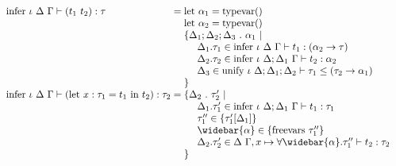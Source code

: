 \documentclass[sigplan,screen]{acmart}
\begin{document}
\begin{figure*}[h]
\[\begin{array}{l @{} l}
      \text{infer } \iota\ \Delta\ \Gamma \vdash 
      (t_1\ t_2) : \tau
      &{} =
      \begin{array}[t]{@{} l}
        \text{let } \alpha_1 = \text{typevar}()
        \\
        \text{let } \alpha_2 = \text{typevar}()
        \\
        \{ \Delta_1;\Delta_2;\Delta_3\ .\ \alpha_1 \ |\
        \\
        \ \ \ \ \Delta_1.\tau_1 \in \text{infer } \iota\ \Delta\ \Gamma \vdash t_1 : (\alpha_2 \rightarrow \tau) 
        \\
        \ \ \ \ \Delta_2.\tau_2 \in \text{infer } \iota\ \Delta;\Delta_1\ \Gamma \vdash t_2 : \alpha_2
        \\
        \ \ \ \ \Delta_3 \in \text{unify } \iota\ \Delta;\Delta_1;\Delta_2 \vdash 
        \tau_1 \leq (\tau_2 \rightarrow \alpha_1)
        \\
        \}
      \end{array}
      \\

      \text{infer } \iota\ \Delta\ \Gamma \vdash 
      (\text{let}\ x : \tau_1 = t_1 \text{ in } t_2) : \tau_2
      &{} =
      \begin{array}[t]{@{} l}
        \{ \Delta_2\ .\ \tau_2' \ |\ 
        \\
        \ \ \ \ \Delta_1.\tau_1' \in \text{infer } \iota\ \Delta;\Delta_1\ \Gamma \vdash t_1 : \tau_1
        \\ 
        \ \ \ \ \tau_1'' \in \{\tau_1'[\Delta_1]\}
        \\ 
        \ \ \ \ \widebar{\alpha} \in \{\text{freevars}\ \tau_1''\}
        \\ 
        \ \ \ \ \Delta_2.\tau_2' \in \Delta\ \Gamma,x \mapsto \forall \widebar{\alpha} . \tau_1''
          \vdash t_2 : \tau_2 
        \\
        \} 
      \end{array}
      \\


\end{array}\]
\end{figure*}
\end{document}
